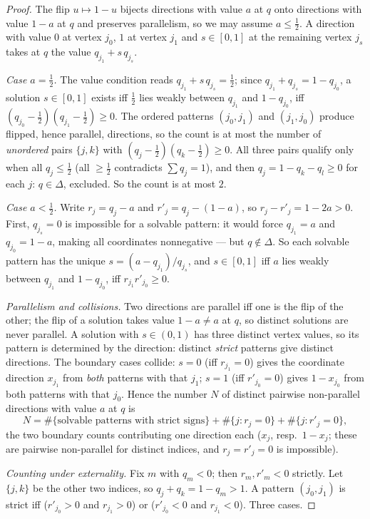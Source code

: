 \documentclass[11pt,reqno]{amsart}
\theoremstyle{plain}
\theoremstyle{definition}
\theoremstyle{remark}
\begin{document}
\begin{proof}
The flip $u\mapsto1-u$ bijects directions with value $a$ at $q$ onto
directions with value $1-a$ at $q$ and preserves parallelism, so we may
assume $a\le\tfrac12$. A direction with value $0$ at vertex $j_0$, $1$ at
vertex $j_1$ and $s\in[0,1]$ at the remaining vertex $j_s$ takes at $q$ the
value $q_{j_1}+s\,q_{j_s}$.

\emph{Case $a=\tfrac12$.} The value condition reads
$q_{j_1}+s\,q_{j_s}=\tfrac12$; since $q_{j_1}+q_{j_s}=1-q_{j_0}$, a solution
$s\in[0,1]$ exists iff $\tfrac12$ lies weakly between $q_{j_1}$ and
$1-q_{j_0}$, iff $(q_{j_0}-\tfrac12)(q_{j_1}-\tfrac12)\ge0$. The ordered
patterns $(j_0,j_1)$ and $(j_1,j_0)$ produce flipped, hence parallel,
directions, so the count is at most the number of \emph{unordered} pairs
$\{j,k\}$ with $(q_j-\tfrac12)(q_k-\tfrac12)\ge0$. All three pairs qualify
only when all $q_j\le\tfrac12$ (all $\ge\tfrac12$ contradicts $\sum q_j=1$),
and then $q_j=1-q_k-q_l\ge0$ for each $j$: $q\in\Delta$, excluded. So the
count is at most $2$.

\emph{Case $a<\tfrac12$.} Write $r_j=q_j-a$ and $r'_j=q_j-(1-a)$, so
$r_j-r'_j=1-2a>0$. First, $q_{j_s}=0$ is impossible for a solvable pattern:
it would force $q_{j_1}=a$ and $q_{j_0}=1-a$, making all coordinates
nonnegative --- but $q\notin\Delta$. So each solvable pattern has the unique
$s=(a-q_{j_1})/q_{j_s}$, and $s\in[0,1]$ iff $a$ lies weakly between
$q_{j_1}$ and $1-q_{j_0}$, iff $r_{j_1}r'_{j_0}\ge0$.

\emph{Parallelism and collisions.} Two directions are parallel iff one is
the flip of the other; the flip of a solution takes value $1-a\ne a$ at $q$,
so distinct solutions are never parallel. A solution with $s\in(0,1)$ has
three distinct vertex values, so its pattern is determined by the direction:
distinct \emph{strict} patterns give distinct directions. The boundary cases
collide: $s=0$ (iff $r_{j_1}=0$) gives the coordinate direction $x_{j_1}$
from \emph{both} patterns with that $j_1$; $s=1$ (iff $r'_{j_0}=0$) gives
$1-x_{j_0}$ from both patterns with that $j_0$. Hence the number $N$ of
distinct pairwise non-parallel directions with value $a$ at $q$ is
\[
N=\#\{\text{solvable patterns with strict signs}\}
+\#\{j:r_j=0\}+\#\{j:r'_j=0\},
\]
the two boundary counts contributing one direction each ($x_j$, resp.\
$1-x_j$; these are pairwise non-parallel for distinct indices, and
$r_j=r'_j=0$ is impossible).

\emph{Counting under externality.} Fix $m$ with $q_m<0$; then $r_m,r'_m<0$
strictly. Let $\{j,k\}$ be the other two indices, so $q_j+q_k=1-q_m>1$. A
pattern $(j_0,j_1)$ is strict iff ($r'_{j_0}>0$ and $r_{j_1}>0$) or
($r'_{j_0}<0$ and $r_{j_1}<0$). Three cases.


\end{proof}
\end{document}
